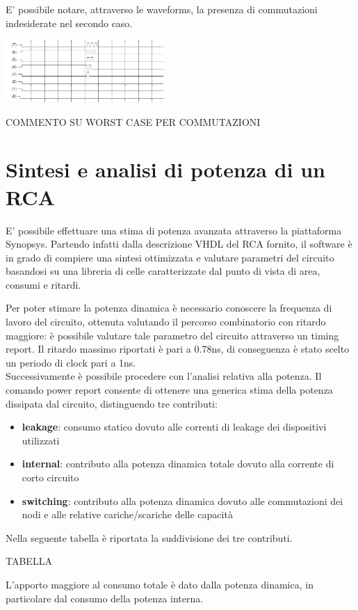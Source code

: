 E' possibile notare, attraverso le waveforms, la presenza di commutazioni indesiderate nel secondo caso.
 
\includegraphics[width=6cm]{./img/Lab_1/Es_2/Glitch_worst_case.png}

COMMENTO SU WORST CASE PER COMMUTAZIONI

\section{Sintesi e analisi di potenza di un RCA}

E' possibile effettuare una stima di potenza avanzata attraverso la piattaforma Synopsys. 
Partendo infatti dalla descrizione VHDL del RCA fornito, il software è in grado di compiere una sintesi ottimizzata e valutare parametri del circuito basandosi su una libreria di celle caratterizzate dal punto di vista di area, consumi e ritardi.

Per poter stimare la potenza dinamica è necessario conoscere la frequenza di lavoro del circuito, ottenuta valutando il percorso combinatorio con ritardo maggiore: è possibile valutare tale parametro del circuito attraverso un timing report.
Il ritardo massimo riportati è pari a 0.78ns, di conseguenza è stato scelto un periodo di clock pari a 1ns.\\
Successivamente è possibile procedere con l'analisi relativa alla potenza.
Il comando power report consente di ottenere una generica stima della potenza dissipata dal circuito, distinguendo tre contributi:
\begin{itemize}
\item \textbf{leakage}: consumo statico dovuto alle correnti di leakage dei dispositivi utilizzati
\item \textbf{internal}: contributo alla potenza dinamica totale dovuto alla corrente di corto circuito
\item \textbf{switching}: contributo alla potenza dinamica dovuto alle commutazioni dei nodi e alle relative cariche/scariche delle capacità
\end{itemize}
Nella seguente tabella è riportata la suddivisione dei tre contributi.

TABELLA

L'apporto maggiore al consumo totale è dato dalla potenza dinamica, in particolare dal consumo della potenza interna.

